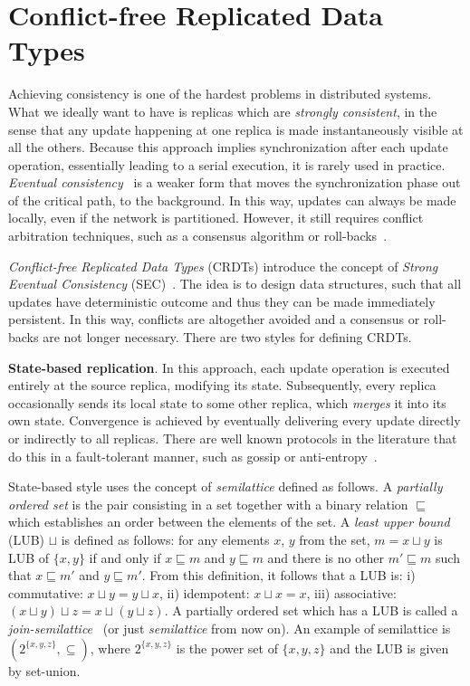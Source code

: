 \section{Conflict-free Replicated Data Types}
\label{sec:crdts}

Achieving consistency is one of the hardest problems in distributed
systems. What we ideally want to have is replicas which are \textit{strongly
consistent}, in the sense that any update happening at one replica is made
instantaneously visible at all the others. Because this approach implies
synchronization after each update operation, essentially leading to a serial
execution, it is rarely used in practice. \textit{Eventual
consistency}~\cite{DBLP:journals/queue/Vogels08a,Saito:2005:OR:1057977.1057980}
is a weaker form that moves the synchronization phase out of the critical path,
to the background. In this way, updates can always be made locally, even if the
network is partitioned. However, it still requires conflict arbitration
techniques, such as a consensus algorithm or
roll-backs~\cite{Terry:1995:MUC:224056.224070}.

\textit{Conflict-free Replicated Data Types} (CRDTs) introduce the concept of
\textit{Strong Eventual Consistency}
(SEC)~\cite{Shapiro:2011:CRD:2050613.2050642}. The idea is to design data
structures, such that all updates have deterministic outcome and thus they can
be made immediately persistent. In this way, conflicts are altogether avoided
and a consensus or roll-backs are not longer necessary. There are two
styles for defining CRDTs.

\textbf{State-based replication}. In this approach, each update operation is
executed entirely at the source replica, modifying its state. Subsequently,
every replica occasionally sends its local state to some other replica, which
\textit{merges} it into its own state. Convergence is achieved by eventually
delivering every update directly or indirectly to all replicas. There are well
known protocols in the literature that do this in a fault-tolerant manner, such
as gossip or anti-entropy~\cite{Demers:1987:EAR:41840.41841,
Petersen:1997:FUP:268998.266711}.

State-based style uses the concept of \textit{semilattice} defined as follows. A
\textit{partially ordered set} is the pair consisting in a set together with a
binary relation $\sqsubseteq$ which establishes an order between the elements of
the set. A \textit{least upper bound} (LUB) $\sqcup$ is defined as follows: for
any elements $x$, $y$ from the set, $m = x \sqcup y$ is LUB of $\{x, y\}$ if and
only if $x \sqsubseteq m$ and $y \sqsubseteq m$ and there is no other $m'
\sqsubseteq m$ such that $x \sqsubseteq m'$ and $y \sqsubseteq m'$. From this
definition, it follows that a LUB is: i) commutative: $x \sqcup y = y \sqcup x$,
ii) idempotent: $x \sqcup x = x$, iii) associative: $(x \sqcup y) \sqcup z = x
\sqcup (y \sqcup z)$. A partially ordered set which has a LUB is called a
\textit{join-semilattice}~\cite{semilattice} (or just \textit{semilattice} from
now on). An example of semilattice is $(2^{\{x, y, z\}}, \subseteq)$, where
$2^{\{x, y, z\}}$ is the power set of $\{x, y, z\}$ and the LUB is given by
set-union.

